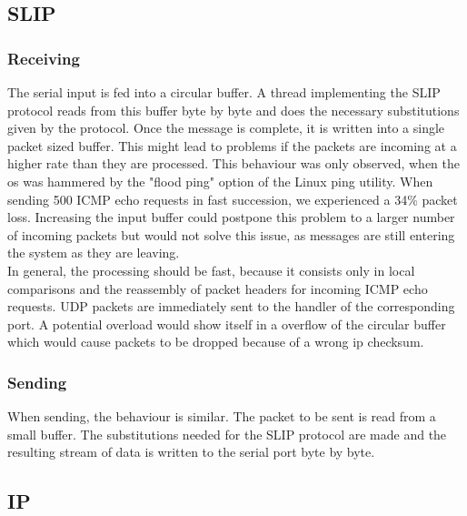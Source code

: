 \subsection{SLIP}
\subsubsection{Receiving}
The serial input is fed into a circular buffer. A thread implementing the SLIP protocol reads from this buffer byte by byte and does the necessary substitutions given by the protocol. Once the message is complete, it is written into a single packet sized buffer. This might lead to problems if the packets are incoming at a higher rate than they are processed. This behaviour was only observed, when the os was hammered by the "flood ping" option of the Linux ping utility. When sending 500 ICMP echo requests in fast succession, we experienced a 34\% packet loss. Increasing the input buffer could postpone this problem to a larger number of incoming packets but would not solve this issue, as messages are still entering the system as they are leaving. \\
	In general, the processing should be fast, because it consists only in local comparisons and the reassembly of packet headers for incoming ICMP echo requests. UDP packets are immediately sent to the handler of the corresponding port. A potential overload would show itself in a overflow of the circular buffer which would cause packets to be dropped because of a wrong ip checksum.
\subsubsection{Sending}
When sending, the behaviour is similar. The packet to be sent is read from a small buffer. The substitutions needed for the SLIP protocol are made and the resulting stream of data is written to the serial port byte by byte.
\subsection{IP}

